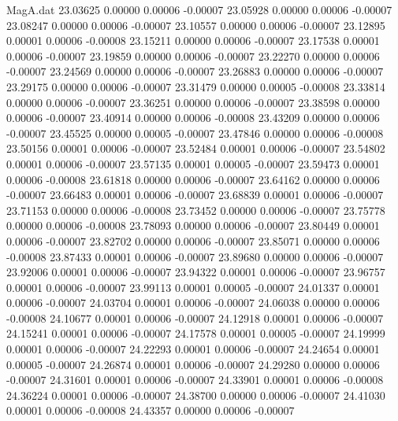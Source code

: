 \begin{filecontents}{MagA.dat}
  23.03625    0.00000    0.00006   -0.00007
  23.05928    0.00000    0.00006   -0.00007
  23.08247    0.00000    0.00006   -0.00007
  23.10557    0.00000    0.00006   -0.00007
  23.12895    0.00001    0.00006   -0.00008
  23.15211    0.00000    0.00006   -0.00007
  23.17538    0.00001    0.00006   -0.00007
  23.19859    0.00000    0.00006   -0.00007
  23.22270    0.00000    0.00006   -0.00007
  23.24569    0.00000    0.00006   -0.00007
  23.26883    0.00000    0.00006   -0.00007
  23.29175    0.00000    0.00006   -0.00007
  23.31479    0.00000    0.00005   -0.00008
  23.33814    0.00000    0.00006   -0.00007
  23.36251    0.00000    0.00006   -0.00007
  23.38598    0.00000    0.00006   -0.00007
  23.40914    0.00000    0.00006   -0.00008
  23.43209    0.00000    0.00006   -0.00007
  23.45525    0.00000    0.00005   -0.00007
  23.47846    0.00000    0.00006   -0.00008
  23.50156    0.00001    0.00006   -0.00007
  23.52484    0.00001    0.00006   -0.00007
  23.54802    0.00001    0.00006   -0.00007
  23.57135    0.00001    0.00005   -0.00007
  23.59473    0.00001    0.00006   -0.00008
  23.61818    0.00000    0.00006   -0.00007
  23.64162    0.00000    0.00006   -0.00007
  23.66483    0.00001    0.00006   -0.00007
  23.68839    0.00001    0.00006   -0.00007
  23.71153    0.00000    0.00006   -0.00008
  23.73452    0.00000    0.00006   -0.00007
  23.75778    0.00000    0.00006   -0.00008
  23.78093    0.00000    0.00006   -0.00007
  23.80449    0.00001    0.00006   -0.00007
  23.82702    0.00000    0.00006   -0.00007
  23.85071    0.00000    0.00006   -0.00008
  23.87433    0.00001    0.00006   -0.00007
  23.89680    0.00000    0.00006   -0.00007
  23.92006    0.00001    0.00006   -0.00007
  23.94322    0.00001    0.00006   -0.00007
  23.96757    0.00001    0.00006   -0.00007
  23.99113    0.00001    0.00005   -0.00007
  24.01337    0.00001    0.00006   -0.00007
  24.03704    0.00001    0.00006   -0.00007
  24.06038    0.00000    0.00006   -0.00008
  24.10677    0.00001    0.00006   -0.00007
  24.12918    0.00001    0.00006   -0.00007
  24.15241    0.00001    0.00006   -0.00007
  24.17578    0.00001    0.00005   -0.00007
  24.19999    0.00001    0.00006   -0.00007
  24.22293    0.00001    0.00006   -0.00007
  24.24654    0.00001    0.00005   -0.00007
  24.26874    0.00001    0.00006   -0.00007
  24.29280    0.00000    0.00006   -0.00007
  24.31601    0.00001    0.00006   -0.00007
  24.33901    0.00001    0.00006   -0.00008
  24.36224    0.00001    0.00006   -0.00007
  24.38700    0.00000    0.00006   -0.00007
  24.41030    0.00001    0.00006   -0.00008
  24.43357    0.00000    0.00006   -0.00007

\end{filecontents}
